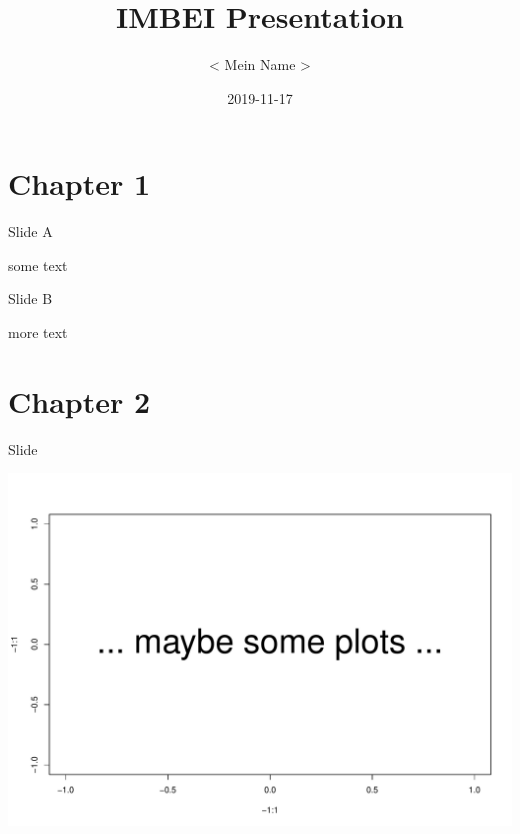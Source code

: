 \documentclass[ignorenonframetext,]{beamer}
\title{IMBEI Presentation}
\author{\textless{} Mein Name \textgreater{}}
\date{2019-11-17}
\begin{document}
\frame{\titlepage}

\section{Chapter 1}\label{chapter-1}

\begin{frame}{Slide A}

some text

\end{frame}

\begin{frame}{Slide B}

more text

\end{frame}

\section{Chapter 2}\label{chapter-2}

\begin{frame}{Slide}

\includegraphics{skeleton_files/figure-beamer/unnamed-chunk-1-1.pdf}

\end{frame}
\end{document}
